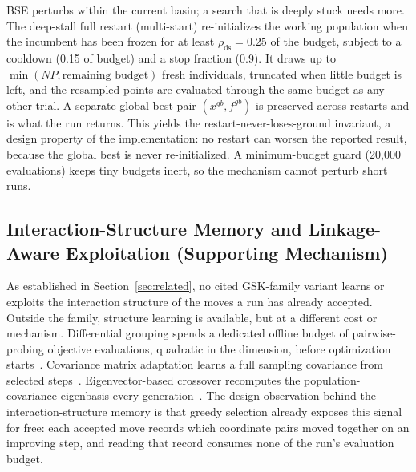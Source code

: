 BSE perturbs within the current basin; a search that is deeply stuck
needs more.
The deep-stall full restart (multi-start) re-initializes the working
population when the incumbent has been frozen for at least
$\rho_{\text{ds}}=0.25$ of the budget, subject to a cooldown
(0.15 of budget) and a stop fraction (0.9). It draws up to
$\min(NP, \text{remaining budget})$ fresh individuals, truncated when little
budget is left, and the resampled points are evaluated through the same budget
as any other trial. A separate
global-best pair $(x^{gb},f^{gb})$ is preserved across restarts and is what
the run returns. %
This yields the restart-never-loses-ground invariant, a design
property of the implementation: no restart can worsen the reported
result, because the global best is never re-initialized.
A minimum-budget guard (20{,}000 evaluations) keeps tiny budgets
inert, so the mechanism cannot perturb short
runs. %

\subsection{Interaction-Structure Memory and Linkage-Aware Exploitation (Supporting Mechanism)}\label{sec:alg:ism}



As established in Section~\ref{sec:related}, no cited GSK-family variant
learns or exploits the interaction structure of the moves a run has
already accepted.
Outside the family, structure learning is available, but at a different
cost or mechanism. Differential grouping spends a dedicated offline
budget of pairwise-probing objective evaluations, quadratic in the
dimension, before optimization starts~\cite{omidvar2014dg}. Covariance
matrix adaptation learns a full sampling covariance from selected
steps~\cite{hansen2001cmaes}. Eigenvector-based crossover
recomputes the population-covariance eigenbasis every
generation~\cite{guo2015eig}. %
The design observation behind the interaction-structure memory is that greedy
selection already exposes this signal for free: each accepted move
records which coordinate pairs moved together on an improving step, and
reading that record consumes none of the run's evaluation budget.

